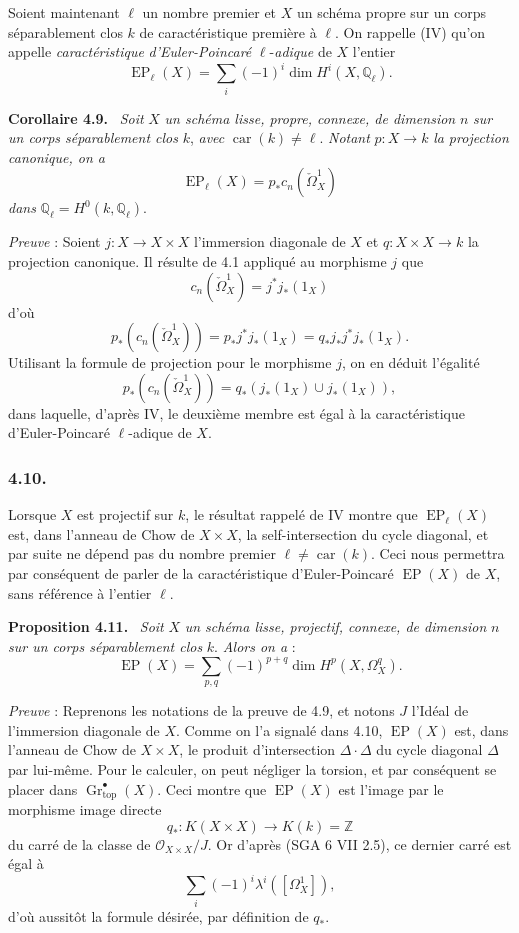 \documentclass[11pt]{article}
\newenvironment{statement}[1]{\par\medskip\noindent\textbf{#1.}\ }{\par\medskip}
\begin{document}
Soient maintenant $\ell$ un nombre premier et $X$ un schéma propre sur un corps séparablement clos $k$ de caractéristique première à $\ell$. On rappelle (IV) qu'on appelle \emph{caractéristique} \emph{d'Euler-Poincaré} $\ell$-\emph{adique} de $X$ l'entier
\[
\operatorname{EP}_\ell(X)=\sum_i(-1)^i\dim H^i(X,\mathbb Q_\ell).
\]

\begin{statement}{Corollaire 4.9}
\emph{Soit} $X$ \emph{un schéma lisse, propre, connexe, de dimension} $n$ \emph{sur un corps séparablement clos} $k$, \emph{avec} $\operatorname{car}(k)\ne\ell$. \emph{Notant} $p:X\to k$ \emph{la projection canonique, on a}
\[
\operatorname{EP}_\ell(X)=p_*c_n(\check\Omega^1_X)
\]
\emph{dans} $\mathbb Q_\ell=H^0(k,\mathbb Q_\ell)$.
\end{statement}

\emph{Preuve} : Soient $j:X\to X\times X$ l'immersion diagonale de $X$ et $q:X\times X\to k$ la projection canonique. Il résulte de 4.1 appliqué au morphisme $j$ que
\[
c_n(\check\Omega^1_X)=j^*j_*(1_X)
\]
d'où
\[
p_*(c_n(\check\Omega^1_X))=p_*j^*j_*(1_X)=q_*j_*j^*j_*(1_X).
\]
Utilisant la formule de projection pour le morphisme $j$, on en déduit l'égalité
\[
p_*(c_n(\check\Omega^1_X))=q_*(j_*(1_X)\cup j_*(1_X)),
\]
dans laquelle, d'après IV, le deuxième membre est égal à la caractéristique d'Euler-Poincaré $\ell$-adique de $X$.

\subsubsection*{4.10.}
Lorsque $X$ est projectif sur $k$, le résultat rappelé de IV montre que $\operatorname{EP}_\ell(X)$ est, dans l'anneau de Chow de $X\times X$, la self-intersection du cycle diagonal, et par suite ne dépend pas du nombre premier $\ell\ne\operatorname{car}(k)$. Ceci nous permettra par conséquent de parler de la caractéristique d'Euler-Poincaré $\operatorname{EP}(X)$ de $X$, sans référence à l'entier $\ell$.

\begin{statement}{Proposition 4.11}
\emph{Soit} $X$ \emph{un schéma lisse, projectif, connexe, de dimension} $n$ \emph{sur un corps séparablement clos} $k$. \emph{Alors on a} :
\[
\operatorname{EP}(X)=\sum_{p,q}(-1)^{p+q}\dim H^p(X,\Omega_X^q).
\]
\end{statement}

\emph{Preuve} : Reprenons les notations de la preuve de 4.9, et notons $J$ l'Idéal de l'immersion diagonale de $X$. Comme on l'a signalé dans 4.10, $\operatorname{EP}(X)$ est, dans l'anneau de Chow de $X\times X$, le produit d'intersection $\Delta\cdot\Delta$ du cycle diagonal $\Delta$ par lui-même. Pour le calculer, on peut négliger la torsion, et par conséquent se placer dans $\operatorname{Gr}_{\mathrm{top}}^\bullet(X)$. Ceci montre que $\operatorname{EP}(X)$ est l'image par le morphisme image directe
\[
q_*:K(X\times X)\to K(k)=\mathbb Z
\]
du carré de la classe de $\mathcal O_{X\times X}/J$. Or d'après (SGA 6 VII 2.5), ce dernier carré est égal à
\[
\sum_i(-1)^i\lambda^i([\Omega_X^1]),
\]
d'où aussitôt la formule désirée, par définition de $q_*$.
\end{document}
